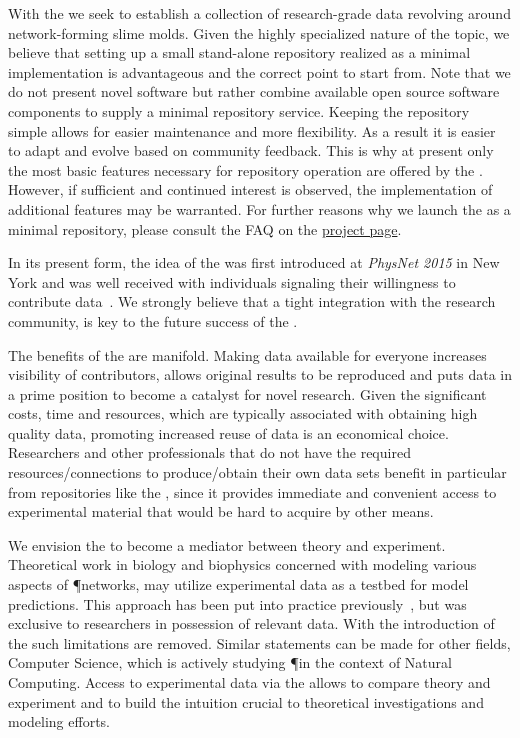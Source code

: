 	With the \SMGR we seek to establish a collection of research-grade data revolving around network-forming slime molds. Given the highly specialized nature of the topic, we believe that setting up a small stand-alone repository realized as a minimal implementation is advantageous and the correct point to start from. Note that we do not present novel software but rather combine available open source software components to supply a minimal repository service. Keeping the repository simple allows for easier maintenance and more flexibility. As a result it is easier to adapt and evolve based on community feedback. This is why at present only the most basic features necessary for repository operation are offered by the \SMGR. However, if sufficient and continued interest is observed, the implementation of additional features may be warranted. For further reasons why we launch the \SMGR as a minimal repository, please consult the FAQ on the \href{http://smgr.mpi-inf.mpg.de}{\SMGR project page}. 

	In its present form, the idea of the \SMGR was first introduced at \emph{PhysNet 2015} in New York and was well received with individuals signaling their willingness to contribute data~\cite{physnet2015}. We strongly believe that a tight integration with the research community, is key to the future success of the \SMGR. 

	The benefits of the \SMGR are manifold. Making data available for everyone increases visibility of contributors, allows original results to be reproduced and puts data in a prime position to become a catalyst for novel research. Given the significant costs, \ie time and resources, which are typically associated with obtaining high quality data, promoting increased reuse of data is an economical choice. Researchers and other professionals that do not have the required resources/connections to produce/obtain their own data sets benefit in particular from repositories like the \SMGR, since it provides immediate and convenient access to experimental material that would be hard to acquire by other means. 

	We envision the \SMGR to become a mediator between theory and experiment. Theoretical work in biology and biophysics concerned with modeling various aspects of \P networks, may utilize experimental data as a testbed for model predictions. This approach has been put into practice previously~\cite{baumgarten2015network}, but was exclusive to researchers in possession of relevant data. With the introduction of the \SMGR such limitations are removed. Similar statements can be made for other fields, \eg Computer Science, which is actively studying \P in the context of Natural Computing. Access to experimental data via the \SMGR allows to compare theory and experiment and to build the intuition crucial to theoretical investigations and modeling efforts. 

